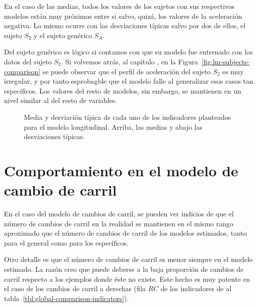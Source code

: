 En el caso de las medias, todos los valores de los sujetos con sus respectivos modelos están muy próximos entre si salvo, quizá, los valores de la aceleración negativa. Lo mismo ocurre con las desviaciones típicas salvo por dos de ellos, el sujeto $S_2$ y el sujeto genérico $S_A$.

Del sujeto genérico es lógico si contamos con que su modelo fue entrenado con los datos del sujeto $S_2$. Si volvemos atrás, al capítulo , en la Figura~\ref{fig:lm-subjects-comparison} se puede observar que el perfil de aceleración del sujeto $S_2$ es muy irregular, y por tanto esprobagble que el modelo falle al generalizar esos casos tan específicos. Los valores del resto de modelos, sin embargo, se mantienen en un nivel similar al del resto de variables.

\begin{figure}[t]
	\centering
	\qquad
	\qquad
	\caption[Medias y desviaciones típicas de los indicadores del modelo longitudinal]{Media y desviación típica de cada uno de los indicadores planteados para el modelo longitudinal. Arriba, las medias y abajo las desviaciones típicas.}
	\label{fig:lc-global-comparison-indicators}
\end{figure}

\section{Comportamiento en el modelo de cambio de carril}

En el caso del modelo de cambios de carril, se pueden ver indicios de que el número de cambios de carril en la realidad se mantienen en el mismo rango aproximado que el número de cambios de carril de los modelos estimados, tanto para el general como para los específicos.

Otro detalle es que el número de cambios de carril es menor siempre en el modelo estimado. La razón creo que puede deberse a la baja proporción de cambios de carril respecto a los ejemplos donde éste no existe. Este hecho es muy patente en el caso de los cambios de carril a derechas (fila $RC$ de los indicadores de al tabla~\ref{tbl:global-comparison-indicators}).